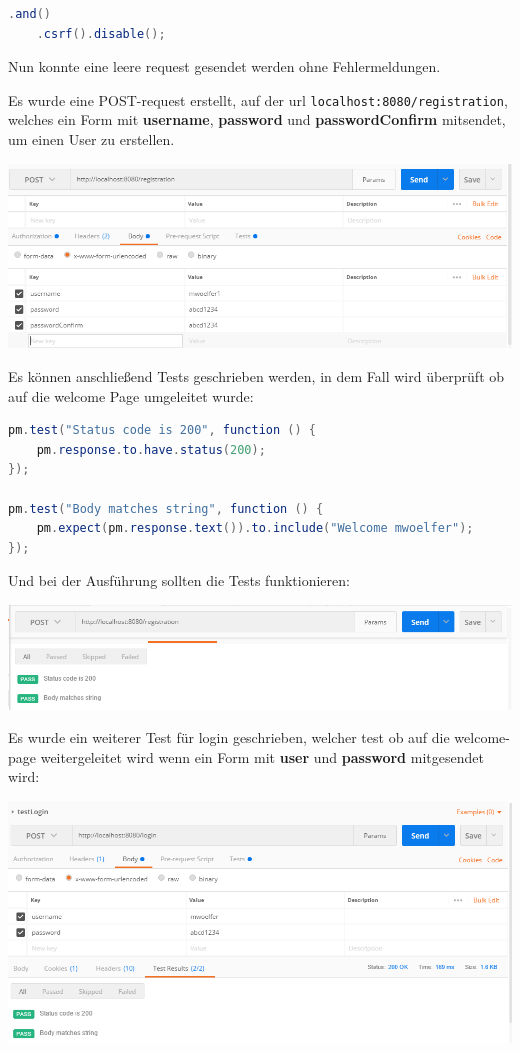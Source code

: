 \begin{lstlisting}[language=Java]
	.and()
	.csrf().disable();
\end{lstlisting}

Nun konnte eine leere request gesendet werden ohne Fehlermeldungen.

Es wurde eine POST-request erstellt, auf der url \verb|localhost:8080/registration|, welches ein Form mit \textbf{username}, \textbf{password} und \textbf{passwordConfirm} mitsendet, um einen User zu erstellen.

\begin{minipage}{\linewidth}
	\centering
	\includegraphics[width=0.6\linewidth]{images/test2}
\end{minipage}

Es können anschließend Tests geschrieben werden, in dem Fall wird überprüft ob auf die welcome Page umgeleitet wurde:

\begin{lstlisting}[language=Java]
pm.test("Status code is 200", function () {
	pm.response.to.have.status(200);
});

pm.test("Body matches string", function () {
	pm.expect(pm.response.text()).to.include("Welcome mwoelfer");
});

\end{lstlisting}

Und bei der Ausführung sollten die Tests funktionieren:

\begin{minipage}{\linewidth}
	\centering
	\includegraphics[width=0.6\linewidth]{images/test3}
\end{minipage}

\clearpage

Es wurde ein weiterer Test für login geschrieben, welcher test ob auf die welcome-page weitergeleitet wird wenn ein Form mit \textbf{user} und \textbf{password} mitgesendet wird:

\begin{minipage}{\linewidth}
	\centering
	\includegraphics[width=0.6\linewidth]{images/test4}
\end{minipage}